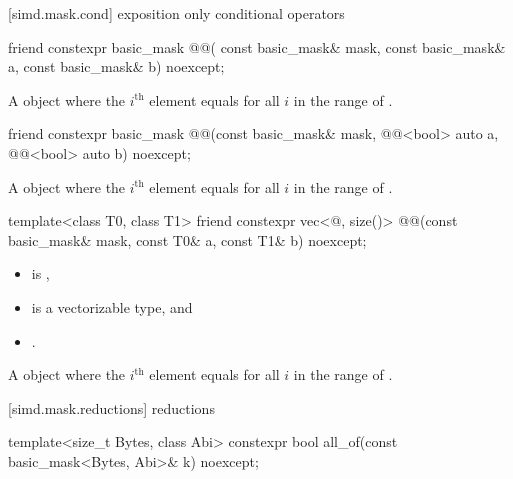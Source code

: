 [simd.mask.cond]{ exposition only conditional operators}

\begin{itemdecl}
friend constexpr basic_mask @@(
  const basic_mask& mask, const basic_mask& a, const basic_mask& b) noexcept;
\end{itemdecl}

\begin{itemdescr}
\pnum
\returns
A  object where the $i^\text{th}$ element equals
 for all $i$ in the range of
.
\end{itemdescr}

\begin{itemdecl}
friend constexpr basic_mask
@@(const basic_mask& mask, @@<bool> auto a, @@<bool> auto b) noexcept;
\end{itemdecl}

\begin{itemdescr}
\pnum
\returns
A  object where the $i^\text{th}$ element equals
 for all $i$ in the range of .
\end{itemdescr}

\begin{itemdecl}
template<class T0, class T1>
  friend constexpr vec<@\seebelow@, size()>
    @@(const basic_mask& mask, const T0& a, const T1& b) noexcept;
\end{itemdecl}

\begin{itemdescr}
\pnum
\constraints
\begin{itemize}
 \item
    is ,
 \item
    is a vectorizable type, and
 \item
   .
\end{itemize}

\pnum
\returns
A  object where the $i^\text{th}$ element equals
 for all $i$ in the range of .
\end{itemdescr}

[simd.mask.reductions]{ reductions}

\begin{itemdecl}
template<size_t Bytes, class Abi>
  constexpr bool all_of(const basic_mask<Bytes, Abi>& k) noexcept;
\end{itemdecl}

